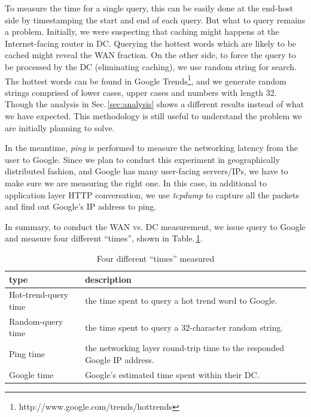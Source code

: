 To measure the time for a single query, this can be easily done at the end-host side by timestamping the start and end of each query. But what to query remains a problem. Initially, we were suspecting that caching might happens at the Internet-facing router in DC. Querying the hottest words which are likely to be cached might reveal the WAN fraction. On the other side, to force the query to be processed by the DC (eliminating caching), we use random string for search. The hottest words can be found in Google Trends\footnote{http://www.google.com/trends/hottrends}, and we generate random strings comprised of lower cases, upper cases and numbers with length 32. Though the analysis in Sec.\,\ref{sec:analysis} shows a different results instead of what we have expected. This methodology is still useful to understand the problem we are initially planning to solve. 

In the meantime, {\it ping} is performed to measure the networking latency from the user to Google. Since we plan to conduct this experiment in geographically distributed fashion, and Google has many user-facing servers/IPs, we have to make sure we are measuring the right one. In this case, in additional to application layer HTTP conversation, we use {\it tcpdump} to capture all the packets and find out Google's IP address to ping.
 
In summary, to conduct the WAN vs. DC measurement, we issue query to Google and measure four different ``times'', shown in Table.\,\ref{tab:DC_method}.

\begin{table}
  \begin{tabular}{p{2.8cm} | p{5cm}}
    \hline
    type & description \\
    \hline
    Hot-trend-query time & the time spent to query a hot trend word to Google. \\
    Random-query time & the time spent to query a 32-character random string.  \\
    Ping time & the networking layer round-trip time to the responded Google IP address. \\
    Google time & Google's estimated time spent within their DC. \\
    \hline
  \end{tabular}
  \caption{Four different ``times'' measured}
  \label{tab:DC_method}
\end{table}




